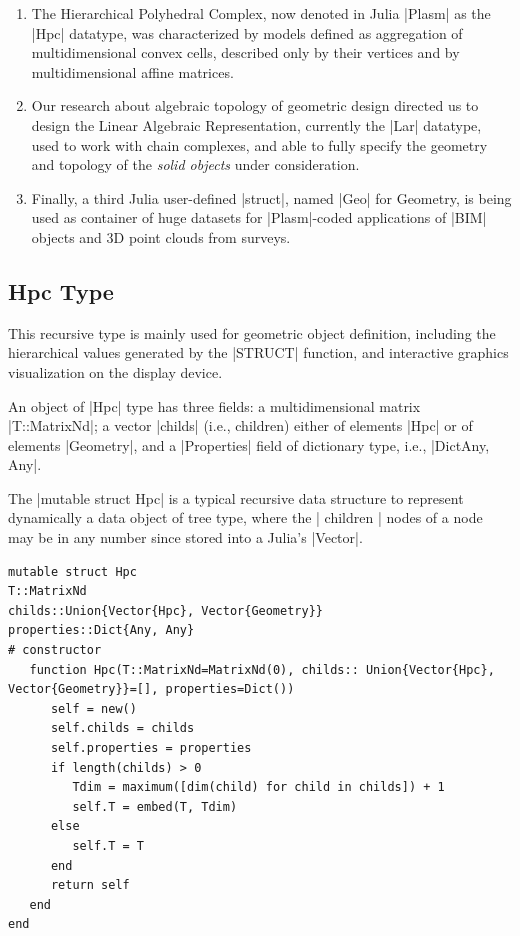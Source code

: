 \begin{enumerate}
\item 
The Hierarchical Polyhedral Complex, now denoted in Julia |Plasm| as the |Hpc| datatype, was characterized by models defined as aggregation of multidimensional convex cells, described only by their vertices and by multidimensional affine matrices.

\item 
Our research about algebraic topology of geometric design directed us to design the Linear Algebraic Representation, currently the |Lar| datatype, used to work with chain complexes, and able to  fully specify the geometry and topology of the \emph{solid objects} under consideration.

\item 
Finally, a third Julia user-defined |struct|, named |Geo| for Geometry, is being used as container of huge datasets for |Plasm|-coded applications of |BIM| objects and 3D point clouds from surveys.  
\end{enumerate}


\subsection*{Hpc Type}\label{sect:4-1-1}

This recursive type is mainly used for geometric object definition, including the hierarchical values generated by the |STRUCT| function, and interactive graphics visualization on the display device.

An object of |Hpc| type has three fields: a multidimensional matrix |T::MatrixNd|; a vector |childs| (i.e., children) either of elements |Hpc| or of elements |Geometry|, and a |Properties| field of dictionary type, i.e., |Dict{Any, Any}|.

The |mutable struct Hpc| is a typical recursive data structure to represent dynamically a data object of tree type, where the | children | nodes of a node may be in any number since stored into a Julia’s |Vector|.

\begin{lstlisting}[language=JuliaLocal, style=julia, mathescape = true] 
mutable struct Hpc
T::MatrixNd
childs::Union{Vector{Hpc}, Vector{Geometry}}
properties::Dict{Any, Any}
# constructor
   function Hpc(T::MatrixNd=MatrixNd(0), childs:: Union{Vector{Hpc}, Vector{Geometry}}=[], properties=Dict())
      self = new()
      self.childs = childs
      self.properties = properties
      if length(childs) > 0
         Tdim = maximum([dim(child) for child in childs]) + 1
         self.T = embed(T, Tdim)
      else
         self.T = T
      end
      return self
   end
end
\end{lstlisting}




